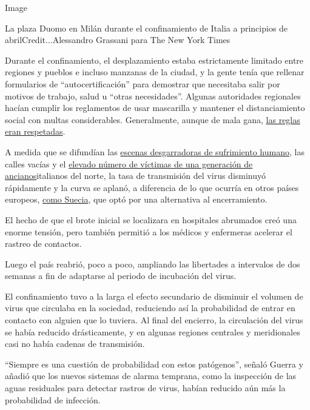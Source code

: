 Image

La plaza Duomo en Milán durante el confinamiento de Italia a principios
de abrilCredit...Alessandro Grassani para The New York Times

Durante el confinamiento, el desplazamiento estaba estrictamente
limitado entre regiones y pueblos e incluso manzanas de la ciudad, y la
gente tenía que rellenar formularios de ``autocertificación'' para
demostrar que necesitaba salir por motivos de trabajo, salud u ``otras
necesidades''. Algunas autoridades regionales hacían cumplir los
reglamentos de usar mascarilla y mantener el distanciamiento social con
multas considerables. Generalmente, aunque de mala gana,
\href{https://www.nytimes.com/2020/03/10/world/europe/italy-coronavirus-movement-restrictions.html}{las
reglas eran respetadas}.

A medida que se difundían las
\href{https://www.nytimes.com/2020/03/16/world/europe/italy-coronavirus-funerals.html}{escenas
desgarradoras de sufrimiento humano}, las calles vacías y el
\href{https://www.nytimes.com/2020/03/04/world/europe/coronavirus-italy-elderly.html}{elevado
número de víctimas de una generación de ancianos}italianos del norte, la
tasa de transmisión del virus disminuyó rápidamente y la curva se
aplanó, a diferencia de lo que ocurría en otros países europeos,
\href{https://www.nytimes.com/2020/07/07/business/sweden-economy-coronavirus.html}{como
Suecia}, que optó por una alternativa al encerramiento.

El hecho de que el brote inicial se localizara en hospitales abrumados
creó una enorme tensión, pero también permitió a los médicos y
enfermeras acelerar el rastreo de contactos.

Luego el país reabrió, poco a poco, ampliando las libertades a
intervalos de dos semanas a fin de adaptarse al periodo de incubación
del virus.

El confinamiento tuvo a la larga el efecto secundario de disminuir el
volumen de virus que circulaba en la sociedad, reduciendo así la
probabilidad de entrar en contacto con alguien que lo tuviera. Al final
del encierro, la circulación del virus se había reducido drásticamente,
y en algunas regiones centrales y meridionales casi no había cadenas de
transmisión.

``Siempre es una cuestión de probabilidad con estos patógenos'', señaló
Guerra y añadió que los nuevos sistemas de alarma temprana, como la
inspección de las aguas residuales para detectar rastros de virus,
habían reducido aún más la probabilidad de infección.

